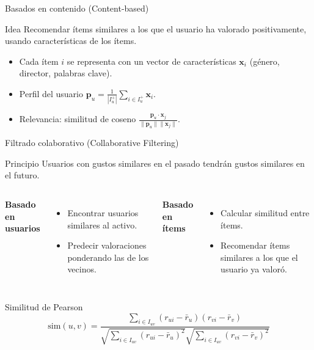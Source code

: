 \documentclass[aspectratio=169, 10pt, xcolor=table]{beamer}
\begin{document}
\begin{frame}{Basados en contenido (Content-based)}
    \begin{block}{Idea}
        Recomendar ítems similares a los que el usuario ha valorado positivamente, usando características de los ítems.
    \end{block}
    \begin{itemize}
        \item Cada ítem $i$ se representa con un vector de características $\mathbf{x}_i$ (género, director, palabras clave).
        \item Perfil del usuario $\mathbf{p}_u = \frac{1}{|I_u^+|}\sum_{i \in I_u^+} \mathbf{x}_i$.
        \item Relevancia: similitud de coseno $\displaystyle \frac{\mathbf{p}_u \cdot \mathbf{x}_j}{\|\mathbf{p}_u\|\|\mathbf{x}_j\|}$.
    \end{itemize}
\end{frame}

\begin{frame}{Filtrado colaborativo (Collaborative Filtering)}
    \begin{block}{Principio}
        Usuarios con gustos similares en el pasado tendrán gustos similares en el futuro.
    \end{block}
    \begin{columns}[t]
        \textbf{Basado en usuarios}
        \begin{itemize}
            \item Encontrar usuarios similares al activo.
            \item Predecir valoraciones ponderando las de los vecinos.
        \end{itemize}
        \textbf{Basado en ítems}
        \begin{itemize}
            \item Calcular similitud entre ítems.
            \item Recomendar ítems similares a los que el usuario ya valoró.
        \end{itemize}
    \end{columns}
    \vspace{0.3cm}
    \begin{block}{Similitud de Pearson}
        \[
        \text{sim}(u,v) = \frac{\sum_{i \in I_{uv}}(r_{ui} - \bar{r}_u)(r_{vi} - \bar{r}_v)}{\sqrt{\sum_{i \in I_{uv}}(r_{ui} - \bar{r}_u)^2}\sqrt{\sum_{i \in I_{uv}}(r_{vi} - \bar{r}_v)^2}}
        \]
    \end{block}
\end{frame}
\end{document}
